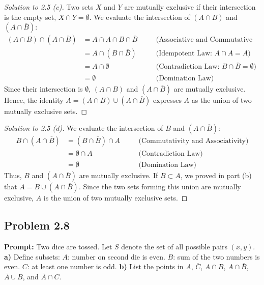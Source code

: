 \documentclass[11pt, letterpaper]{article}
\theoremstyle{definition}
\theoremstyle{remark}
\newcommand{\comp}[1]{\overline{#1}}
\begin{document}
\begin{proof}[Solution to 2.5 (c)]
Two sets $X$ and $Y$ are mutually exclusive if their intersection is the empty set, $X \cap Y = \emptyset$. We evaluate the intersection of $(A \cap B)$ and $(A \cap \comp{B})$:
\begin{align*}
(A \cap B) \cap (A \cap \comp{B}) &= A \cap A \cap B \cap \comp{B} \quad &&\text{(Associative and Commutative Laws)} \\
&= A \cap (B \cap \comp{B}) \quad &&\text{(Idempotent Law: } A \cap A = A) \\
&= A \cap \emptyset \quad &&\text{(Contradiction Law: } B \cap \comp{B} = \emptyset) \\
&= \emptyset \quad &&\text{(Domination Law)}
\end{align*}
Since their intersection is $\emptyset$, $(A \cap B)$ and $(A \cap \comp{B})$ are mutually exclusive. Hence, the identity $A = (A \cap B) \cup (A \cap \comp{B})$ expresses $A$ as the union of two mutually exclusive sets.
\end{proof}

\begin{proof}[Solution to 2.5 (d)]
We evaluate the intersection of $B$ and $(A \cap \comp{B})$:
\begin{align*}
B \cap (A \cap \comp{B}) &= (B \cap \comp{B}) \cap A \quad &&\text{(Commutativity and Associativity)} \\
&= \emptyset \cap A \quad &&\text{(Contradiction Law)} \\
&= \emptyset \quad &&\text{(Domination Law)}
\end{align*}
Thus, $B$ and $(A \cap \comp{B})$ are mutually exclusive. If $B \subset A$, we proved in part (b) that $A = B \cup (A \cap \comp{B})$. Since the two sets forming this union are mutually exclusive, $A$ is the union of two mutually exclusive sets.
\end{proof}

\subsection*{Problem 2.8}
\textbf{Prompt:} Two dice are tossed. Let $S$ denote the set of all possible pairs $(x,y)$.
\textbf{a)} Define subsets: $A$: number on second die is even. $B$: sum of the two numbers is even. $C$: at least one number is odd.
\textbf{b)} List the points in $A$, $\comp{C}$, $A \cap B$, $A \cap \comp{B}$, $\comp{A} \cup B$, and $\comp{A} \cap C$.
\end{document}
